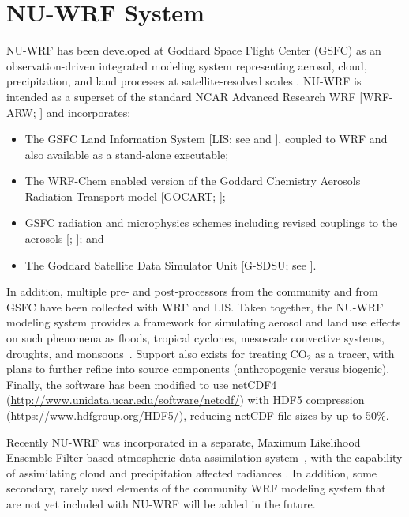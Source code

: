 \section{NU-WRF System}
\label{sec:System}

NU-WRF has been developed at Goddard Space Flight Center (GSFC) as an 
observation-driven integrated modeling system representing aerosol, cloud, 
precipitation, and land processes at satellite-resolved scales
\citep{ref:PetersLidardEtAl2014}. NU-WRF is intended as a superset of the 
standard NCAR Advanced Research WRF [WRF-ARW; \cite{ref:SkamarockEtAl2008}] 
and incorporates:

\begin{itemize} 
\item The GSFC Land 
Information System [LIS; see \cite{ref:KumarEtAl2006} and 
\cite{ref:PetersLidardEtAl2007}], coupled to WRF and also available as a 
stand-alone executable;
\item The WRF-Chem enabled version of the Goddard 
Chemistry Aerosols Radiation Transport model [GOCART; \cite{ref:ChinEtAl2002}];
\item GSFC radiation and microphysics schemes including revised couplings to 
the aerosols [\cite{ref:ShiEtAl2014}; \cite{ref:LangEtAl2014}]; and 
\item The Goddard Satellite Data Simulator 
Unit [G-SDSU; see \cite{ref:MatsuiEtAl2014}].
\end{itemize}
 
In addition, multiple pre- and post-processors from the community and from 
GSFC have been collected with WRF and LIS. Taken together, the NU-WRF modeling
system provides a framework for simulating aerosol and land use effects on 
such phenomena as floods, tropical cyclones, mesoscale convective systems, 
droughts, and monsoons~\citep{ref:PetersLidardEtAl2014}. Support also exists 
for treating CO$_2$ as a tracer, with plans to further refine into source 
components (anthropogenic versus biogenic). Finally, the software has been 
modified to use netCDF4 (\url{http://www.unidata.ucar.edu/software/netcdf/}) 
with HDF5 compression (\url{https://www.hdfgroup.org/HDF5/}), reducing netCDF 
file sizes by up to 50\%.

Recently NU-WRF was incorporated in a separate, Maximum Likelihood Ensemble 
Filter-based atmospheric data assimilation system~\citep{ref:GEDASUserGuide}, 
with the capability of assimilating cloud and precipitation affected radiances
\citep{ref:ZhangEtAl2015}. In addition, some secondary, rarely used elements 
of the community WRF modeling system that are not yet included with NU-WRF 
will be added in the future.


